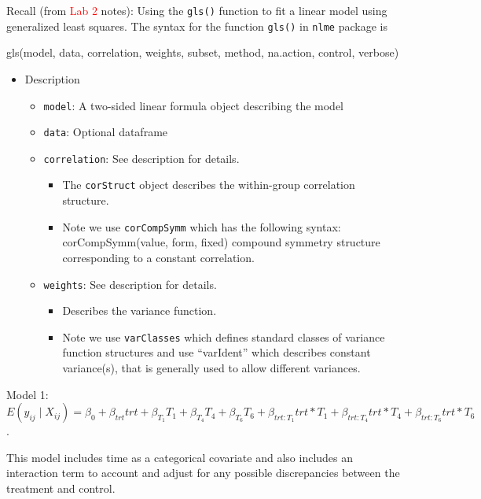 \documentclass[
  letterpaper,
  DIV=11,
  numbers=noendperiod]{scrreprt}
\providecommand{\tightlist}{%
  \setlength{\itemsep}{0pt}\setlength{\parskip}{0pt}}\usepackage{longtable,booktabs,array}
\begin{document}
Recall (from \textcolor{red}{Lab 2} notes): Using the \texttt{gls()}
function to fit a linear model using generalized least squares. The
syntax for the function \texttt{gls()} in \texttt{nlme} package is

gls(model, data, correlation, weights, subset, method, na.action,
control, verbose)

\begin{itemize}
\tightlist
\item
  Description

  \begin{itemize}
  \tightlist
  \item
    \texttt{model}: A two-sided linear formula object describing the
    model
  \item
    \texttt{data}: Optional dataframe
  \item
    \texttt{correlation}: See description for details.

    \begin{itemize}
    \tightlist
    \item
      The \texttt{corStruct} object describes the within-group
      correlation structure.
    \item
      Note we use \texttt{corCompSymm} which has the following syntax:
      corCompSymm(value, form, fixed) compound symmetry structure
      corresponding to a constant correlation.
    \end{itemize}
  \item
    \texttt{weights}: See description for details.

    \begin{itemize}
    \tightlist
    \item
      Describes the variance function.
    \item
      Note we use \texttt{varClasses} which defines standard classes of
      variance function structures and use ``varIdent'' which describes
      constant variance(s), that is generally used to allow different
      variances.
    \end{itemize}
  \end{itemize}
\end{itemize}

Model 1:
\(E(y_{ij} \mid X_{ij}) = \beta_0 + \beta_{trt}trt + \beta_{T_1}T_1 + \beta_{T_4}T_4 + \beta_{T_6}T_6 + \beta_{trt:T_1}trt*T_1 + \beta_{trt:T_4}trt*T_4 + \beta_{trt:T_6}trt*T_6\).

This model includes time as a categorical covariate and also includes an
interaction term to account and adjust for any possible discrepancies
between the treatment and control.
\end{document}
